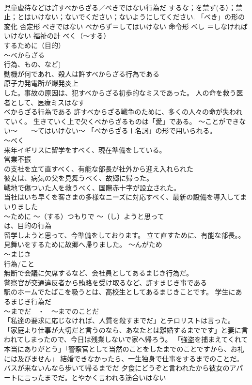 \documentclass[8pt]{extreport}
\begin{document}
\begin{CJK}{UTF8}{min}
\\	児童虐待などは許すべからざる／べきではない行為だ	するな；を禁ず(る）；禁止；とはいけない；ないでください；ないようにしてください. 「べき」の形の変化 否定形 べきではない べからず＝してはいけない 命令形 べし ＝しなければいけない 福祉の計 べく（～する） 
\\	するために（目的）
\\	～べからざる　　
\\	行為、もの、など)	
\\	動機が何であれ、殺人は許すべからざる行為である 
\\	原子力発電所が爆発炎上
\\	した。事故の原因は、犯すべからざる初歩的なミスであった。 人の命を救う医者として、医療ミスはなす
\\	べからざる行為である 許すべからざる戦争のために、多くの人々の命が失われていく。 生きていく上で欠くべからざるものは「愛」である。	～ことができない～　　～てはいけない～ 「べからざる＋名詞」の形で用いられる。 
\\	～べく 
\\	来年イギリスに留学をすべく、現在準備をしている。 
\\	営業不振
\\	の支社を立て直すべく、有能な部長が社外から迎え入れられた
\\	彼女は、病気の父を見舞うべく、故郷に帰った。 
\\	戦地で傷ついた人を救うべく、国際赤十字が設立された。 
\\	当社はいち早くを客さまの多様なニーズに対応すべく、最新の設備を導入してまいりました 
\\	～ために ～（する）つもりで ～（し）ようと思って 
\\	は、目的の行為 
\\	留学しようと思って、今準備をしております。 立て直すために、有能な部長。。 見舞いをするために故郷へ帰りました。 ～んがため
\\	～まじき　
\\	行為/こと	
\\	無断で会議に欠席するなど、会社員としてあるまじき行為だ。 
\\	警察官が交通違反者から賄賂を受け取るなど、許すまじき事である
\\	駅のホームでたばこを吸うとは、高校生としてあるまじきことです。 学生にあるまじき行為だ 
\\	～までだ　・　～までのことだ	
\\	「私達の要求に応じなければ、人質を殺すまでだ」とテロリストは言った。 「家庭より仕事が大切だと言うのなら、あなたとは離婚するまでです」と妻に言われてしまったので、今日は残業しないで家へ帰ろう。 「強盗を捕まえてくれて本当にありがとう」「警察官として当然のことをしたまでのことですから、お礼には及びません」 結婚できなかったら、一生独身で仕事をするまでのことだ。 バスが来ないんなら歩いて帰るまでだ 夕食にどうぞと言われたから彼女のアパートに言ったまでだ。とやかく言われる筋合いはない

\end{CJK}
\end{document}

